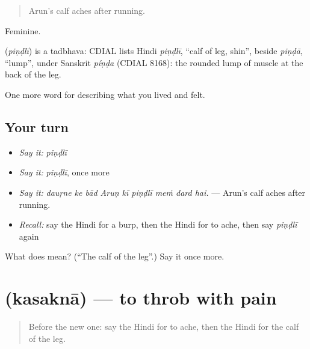 \begin{quote}
Arun's calf aches after running.
\end{quote}

Feminine.

\begin{cousinweb}
\textbf{} (\emph{piṇḍlī}) is a tadbhava: CDIAL lists Hindi \emph{piṇḍlī}, \textquotedblleft{}calf of leg, shin\textquotedblright{}, beside \emph{piṇḍā}, \textquotedblleft{}lump\textquotedblright{}, under Sanskrit \emph{píṇḍa} (CDIAL 8168): the rounded lump of muscle at the back of the leg.
\end{cousinweb}

\begin{grammarlens}[title={What you've built}]
One more word for describing what you lived and felt.
\end{grammarlens}

\subsection*{Your turn}
\begin{itemize}
\raggedright
  \item \emph{Say it:} \emph{piṇḍlī}
  \item \emph{Say it:} \emph{piṇḍlī}, once more
  \item \emph{Say it:} \emph{dauṛne ke bād Aruṇ kī piṇḍlī meṁ dard hai.} — Arun's calf aches after running.
  \item \emph{Recall:} say the Hindi for a burp, then the Hindi for to ache, then say \emph{piṇḍlī} again
\end{itemize}

\begin{tcolorbox}[breakable,colback=teal!4,colframe=teal!35!black,title={Before you move on}]
What does  mean? (\textquotedblleft{}The calf of the leg\textquotedblright{}.) Say it once more.
\end{tcolorbox}
\section[\texorpdfstring{\hi{कसकना} (kasaknā)}{कसकना (kasaknā)}]{ (kasaknā) — to throb with pain}

\label{lesson:HI-C486-kasakna}



\begin{quote}
Before the new one: say the Hindi for to ache, then the Hindi for the calf of the leg.
\end{quote}


